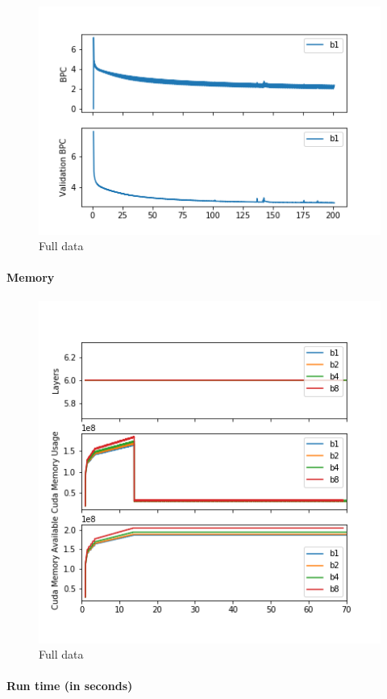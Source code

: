 \begin{figure}
\centering
\includegraphics{b1a8_200.png}
\caption{Full data}
\end{figure}

\paragraph{Memory}\label{memory}

\begin{figure}
\centering
\includegraphics{b1a8_memory.png}
\caption{Full data}
\end{figure}

\paragraph{Run time (in seconds)}\label{run-time-in-seconds}

